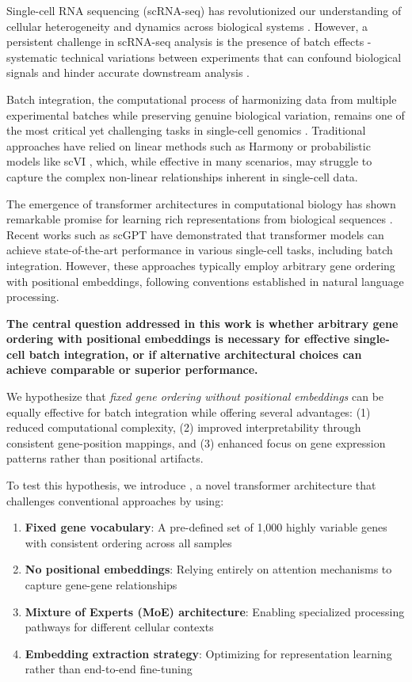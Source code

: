 Single-cell RNA sequencing (scRNA-seq) has revolutionized our understanding of cellular heterogeneity and dynamics across biological systems \cite{tang2009mrna,klein2015droplet}. However, a persistent challenge in scRNA-seq analysis is the presence of batch effects - systematic technical variations between experiments that can confound biological signals and hinder accurate downstream analysis \cite{luecken2019current,tran2020benchmark}.

Batch integration, the computational process of harmonizing data from multiple experimental batches while preserving genuine biological variation, remains one of the most critical yet challenging tasks in single-cell genomics \cite{korsunsky2019fast,lopez2018deep}. Traditional approaches have relied on linear methods such as Harmony \cite{korsunsky2019fast} or probabilistic models like scVI \cite{lopez2018deep}, which, while effective in many scenarios, may struggle to capture the complex non-linear relationships inherent in single-cell data.

The emergence of transformer architectures in computational biology has shown remarkable promise for learning rich representations from biological sequences \cite{vaswani2017attention,rives2021biological}. Recent works such as scGPT \cite{cui2024scgpt} have demonstrated that transformer models can achieve state-of-the-art performance in various single-cell tasks, including batch integration. However, these approaches typically employ arbitrary gene ordering with positional embeddings, following conventions established in natural language processing.

\textbf{The central question addressed in this work is whether arbitrary gene ordering with positional embeddings is necessary for effective single-cell batch integration, or if alternative architectural choices can achieve comparable or superior performance.}

We hypothesize that \textit{fixed gene ordering without positional embeddings} can be equally effective for batch integration while offering several advantages: (1) reduced computational complexity, (2) improved interpretability through consistent gene-position mappings, and (3) enhanced focus on gene expression patterns rather than positional artifacts.

To test this hypothesis, we introduce \bioformer{}, a novel transformer architecture that challenges conventional approaches by using:

\begin{enumerate}
\item \textbf{Fixed gene vocabulary}: A pre-defined set of 1,000 highly variable genes with consistent ordering across all samples
\item \textbf{No positional embeddings}: Relying entirely on attention mechanisms to capture gene-gene relationships
\item \textbf{Mixture of Experts (MoE) architecture}: Enabling specialized processing pathways for different cellular contexts
\item \textbf{Embedding extraction strategy}: Optimizing for representation learning rather than end-to-end fine-tuning
\end{enumerate}

